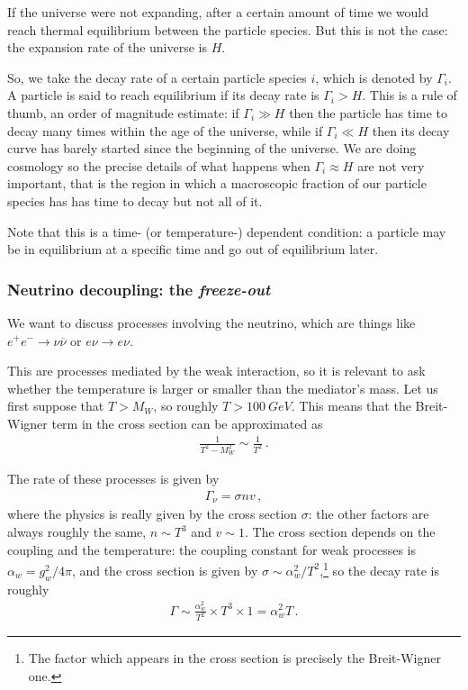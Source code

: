 \documentclass[main.tex]{subfiles}
\begin{document}
If the universe were not expanding, after a certain amount of time we would reach thermal equilibrium between the particle species. 
But this is not the case: the expansion rate of the universe is \(H\).

So, we take the decay rate of a certain particle species \(i\), which is denoted by \(\Gamma_{i}\).
A particle is said to reach equilibrium if its decay rate is \(\Gamma_{i} > H\).
This is a rule of thumb, an order of magnitude estimate: if \(\Gamma_{i} \gg H\) then the particle has time to decay many times within the age of the universe, while if \(\Gamma_{i} \ll H\) then its decay curve has barely started since the beginning of the universe.
We are doing cosmology so the precise details of what happens when \(\Gamma_{i} \approx H\) are not very important, that is the region in which a macroscopic fraction of our particle species has has time to decay but not all of it.

Note that this is a time- (or temperature-) dependent condition: a particle may be in equilibrium at a specific time and go out of equilibrium later. 

\subsubsection{Neutrino decoupling: the \emph{freeze-out}}

We want to discuss processes involving the neutrino, which are things like \(e^{+} e^{-} \to \nu \overline{\nu}\) or \(e \nu \to e \nu \).

This are processes mediated by the weak interaction, so it is relevant to ask whether the temperature is larger or smaller than the mediator's mass.
Let us first suppose that \(T > M_W\), so roughly \(T > \SI{100}{GeV}\).
This means that the Breit-Wigner term in the cross section can be approximated as 
%
\begin{align}
\frac{1}{T^2 - M_W^2} \sim \frac{1}{T^2}
\,.
\end{align}

The rate of these processes is given by 
%
\begin{align}
\Gamma_{\nu } = \sigma n v 
\,,
\end{align}
%
where the physics is really given by the cross section \(\sigma \): the other factors are always roughly the same, \(n \sim T^{3}\) and \(v \sim 1\).
The cross section depends on the coupling and the temperature: the coupling constant for weak processes is \(\alpha_{w} = g_w^2 / 4 \pi \), and the cross section is given by \(\sigma \sim \alpha_{w}^2 / T^2\),\footnote{The factor which appears in the cross section is precisely the Breit-Wigner one.} so the decay rate is roughly
%
\begin{align}
\Gamma \sim \frac{\alpha^2_{w}}{T^2} \times  T^3 \times 1 = \alpha^2_{w} T
\,.
\end{align}
\end{document}

